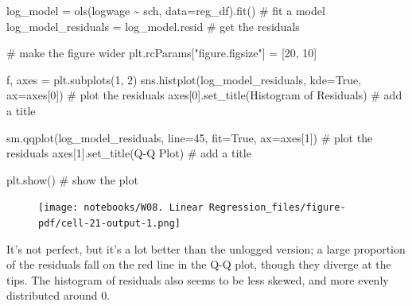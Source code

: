 \documentclass[
  letterpaper,
  DIV=11,
  numbers=noendperiod]{scrreprt}
\newenvironment{Shaded}{\begin{snugshade}}{\end{snugshade}}
\newcommand{\CommentTok}[1]{\textcolor[rgb]{0.37,0.37,0.37}{#1}}
\newcommand{\DecValTok}[1]{\textcolor[rgb]{0.68,0.00,0.00}{#1}}
\newcommand{\NormalTok}[1]{\textcolor[rgb]{0.00,0.23,0.31}{#1}}
\newcommand{\OperatorTok}[1]{\textcolor[rgb]{0.37,0.37,0.37}{#1}}
\newcommand{\StringTok}[1]{\textcolor[rgb]{0.13,0.47,0.30}{#1}}
\newcommand{\VariableTok}[1]{\textcolor[rgb]{0.07,0.07,0.07}{#1}}
\begin{document}
\begin{Shaded}
\begin{Highlighting}[]
\NormalTok{log\_model }\OperatorTok{=}\NormalTok{ ols(}\StringTok{\textquotesingle{}logwage \textasciitilde{}  sch\textquotesingle{}}\NormalTok{, data}\OperatorTok{=}\NormalTok{reg\_df).fit()  }\CommentTok{\# fit a model}
\NormalTok{log\_model\_residuals }\OperatorTok{=}\NormalTok{ log\_model.resid }\CommentTok{\# get the residuals}

\CommentTok{\# make the figure wider}
\NormalTok{plt.rcParams[}\StringTok{"figure.figsize"}\NormalTok{] }\OperatorTok{=}\NormalTok{ [}\DecValTok{20}\NormalTok{, }\DecValTok{10}\NormalTok{]}

\NormalTok{f, axes }\OperatorTok{=}\NormalTok{ plt.subplots(}\DecValTok{1}\NormalTok{, }\DecValTok{2}\NormalTok{)}
\NormalTok{sns.histplot(log\_model\_residuals, kde}\OperatorTok{=}\VariableTok{True}\NormalTok{, ax}\OperatorTok{=}\NormalTok{axes[}\DecValTok{0}\NormalTok{]) }\CommentTok{\# plot the residuals}
\NormalTok{axes[}\DecValTok{0}\NormalTok{].set\_title(}\StringTok{\textquotesingle{}Histogram of Residuals\textquotesingle{}}\NormalTok{) }\CommentTok{\# add a title}

\NormalTok{sm.qqplot(log\_model\_residuals, line}\OperatorTok{=}\StringTok{\textquotesingle{}45\textquotesingle{}}\NormalTok{, fit}\OperatorTok{=}\VariableTok{True}\NormalTok{,  ax}\OperatorTok{=}\NormalTok{axes[}\DecValTok{1}\NormalTok{]) }\CommentTok{\# plot the residuals}
\NormalTok{axes[}\DecValTok{1}\NormalTok{].set\_title(}\StringTok{\textquotesingle{}Q{-}Q Plot\textquotesingle{}}\NormalTok{) }\CommentTok{\# add a title}

\NormalTok{plt.show() }\CommentTok{\# show the plot}
\end{Highlighting}
\end{Shaded}

\begin{figure}[H]

{\centering \texttt{[image: notebooks/W08. Linear Regression\_files/figure-pdf/cell-21-output-1.png]}

}

\end{figure}

It's not perfect, but it's a lot better than the unlogged version; a
large proportion of the residuals fall on the red line in the Q-Q plot,
though they diverge at the tips. The histogram of residuals also seems
to be less skewed, and more evenly distributed around 0.
\end{document}
